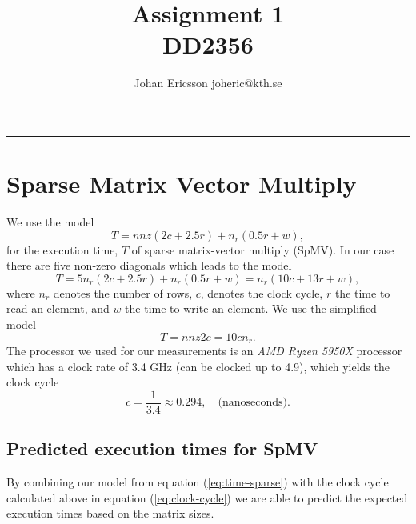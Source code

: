 \documentclass[a4paper, 11pt]{article}
\title{Assignment 1 \\
DD2356}
\author{Johan Ericsson \quad joheric@kth.se}
\begin{document}


\maketitle

\textcolor{black}{\rule{\linewidth}{2pt}}
%

\section{Sparse Matrix Vector Multiply}
We use the model
\[ T = nnz(2c + 2.5r) + n_r(0.5r + w), \]
for the execution time, $T$ of sparse matrix-vector multiply (SpMV). In our case there are five non-zero diagonals which leads to the
model
\[ T = 5 n_r(2c + 2.5r) + n_r(0.5r + w) = n_r(10c + 13r + w), \]
where $n_r$ denotes the number of rows, $c$, denotes the clock cycle, $r$ the time to read an element, and $w$ the time to write an element.
We use the simplified model
\begin{equation}\label{eq:time-sparse}
T = nnz 2c = 10cn_r.
\end{equation}
The processor we used for our measurements is an \textit{AMD Ryzen 5950X} processor which has a clock rate of 3.4 GHz (can be clocked up to 4.9),
which yields the clock cycle
\begin{equation}\label{eq:clock-cycle}
c = \frac{1}{3.4} \approx 0.294, \quad \text{(nanoseconds).}
\end{equation}



\subsection{Predicted execution times for SpMV}
By combining our model from equation (\ref{eq:time-sparse}) with the clock cycle calculated above in equation (\ref{eq:clock-cycle})
we are able to predict the expected execution times based on the matrix sizes. 
\end{document}
